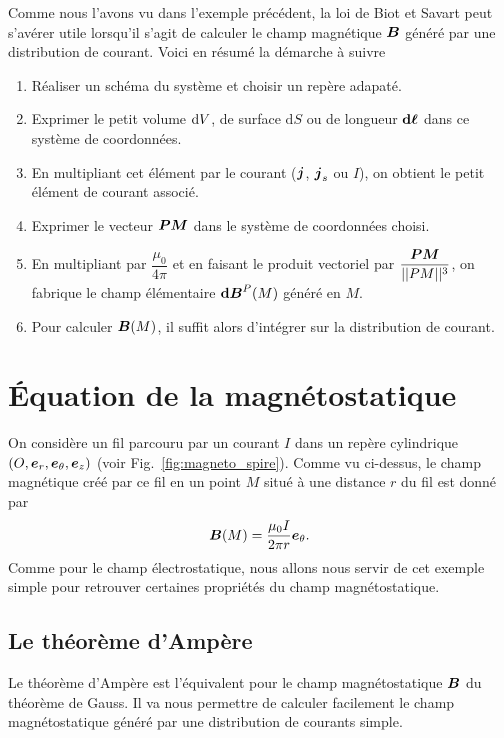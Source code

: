 \begin{defn}
	Comme nous l'avons vu dans l'exemple précédent, la loi de Biot et Savart
	peut s'avérer utile lorsqu'il s'agit de calculer le champ magnétique 
	$\vecb$ généré par une distribution de courant. Voici en résumé la démarche à suivre
	\begin{enumerate}
		\item Réaliser un schéma du système et choisir un repère adapaté.
		\item Exprimer le petit volume $\mathrm{d}V$, de surface $\mathrm{d}S$
		  ou de longueur $\dl$ dans ce système de coordonnées.
	  \item En multipliant cet élément par le courant ($\vecj$, $\vecj_s$ ou
	    $I$), on obtient le petit élément de courant associé.
	  \item Exprimer le vecteur $\mitbf{PM}$ dans le système de coordonnées
	    choisi.
    	\item En multipliant par $\dfrac{\mu_0}{4 \pi}$ et en faisant le produit 
	  vectoriel par $\dfrac{\mitbf{PM}}{||PM||^3}$, on fabrique le champ
	  élémentaire $\mathrm{\textbf{d}}\vecb^P(M)$ généré en $M$.
	\item Pour calculer $\vecb(M)$, il suffit alors d'intégrer sur la distribution
	  de courant.
	\end{enumerate}
\end{defn}
\section{Équation de la magnétostatique}
On considère un fil parcouru par un courant $I$ dans un
repère cylindrique $(O, \er, \etheta, \ez)$ (voir Fig.~\ref{fig:magneto_spire}). 
Comme vu ci-dessus, le champ
magnétique créé par ce fil en un point $M$ situé à une distance $r$ du fil
est donné par
\begin{equation*}
	\vecb(M) = \dfrac{\mu_0 I}{2 \pi r}\etheta.
\end{equation*}
Comme pour le champ électrostatique, nous allons nous servir de cet exemple simple 
pour retrouver certaines propriétés du champ magnétostatique.

\subsection{Le théorème d'Ampère}
Le théorème d'Ampère est l'équivalent pour le champ magnétostatique $\vecb$
du théorème de Gauss. Il va nous permettre de calculer facilement le champ
magnétostatique généré par une distribution de courants simple.

